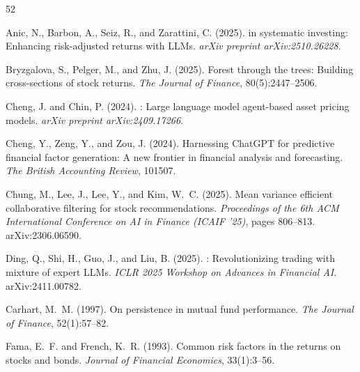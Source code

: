 \ifdefined\withappendix\else
\balance %
\fi


{
\ifdefined\compactappendixrefs
\scriptsize
\fi
\begin{thebibliography}{52}
\ifdefined\compactappendixrefs
\setlength{\itemsep}{0pt}
\setlength{\parsep}{0pt}
\setlength{\parskip}{0pt}
\fi

Anic, N., Barbon, A., Seiz, R., and Zarattini, C. (2025).
 in systematic investing: Enhancing risk-adjusted returns with {LLMs}.
\newblock \emph{arXiv preprint arXiv:2510.26228}.

Bryzgalova, S., Pelger, M., and Zhu, J. (2025).
\newblock Forest through the trees: Building cross-sections of stock returns.
\newblock \emph{The Journal of Finance}, 80(5):2447--2506.

Cheng, J. and Chin, P. (2024).
: Large language model agent-based asset pricing models.
\newblock \emph{arXiv preprint arXiv:2409.17266}.

Cheng, Y., Zeng, Y., and Zou, J. (2024).
\newblock Harnessing {ChatGPT} for predictive financial factor generation: A new frontier in financial analysis and forecasting.
\newblock \emph{The British Accounting Review}, 101507.

Chung, M., Lee, J., Lee, Y., and Kim, W.~C. (2025).
\newblock Mean variance efficient collaborative filtering for stock recommendations.
\newblock \emph{Proceedings of the 6th ACM International Conference on AI in Finance (ICAIF '25)}, pages 806--813. arXiv:2306.06590.

Ding, Q., Shi, H., Guo, J., and Liu, B. (2025).
: Revolutionizing trading with mixture of expert {LLMs}.
\newblock \emph{ICLR 2025 Workshop on Advances in Financial AI}. arXiv:2411.00782.

Carhart, M.~M. (1997).
\newblock On persistence in mutual fund performance.
\newblock \emph{The Journal of Finance}, 52(1):57--82.

Fama, E.~F. and French, K.~R. (1993).
\newblock Common risk factors in the returns on stocks and bonds.
\newblock \emph{Journal of Financial Economics}, 33(1):3--56.


\end{thebibliography}}
